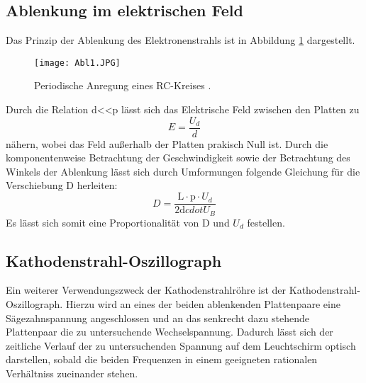 \subsection{Ablenkung im elektrischen Feld}
Das Prinzip der Ablenkung des Elektronenstrahls ist in Abbildung \ref{fig:abl1}
dargestellt.
\begin{figure}[H]
  \centering
  \texttt{[image: Abl1.JPG]}
  \caption{Periodische Anregung eines RC-Kreises \cite{skript}.}
  \label{fig:abl1}
\end{figure}
Durch die Relation d<<p lässt sich das Elektrische Feld zwischen den Platten zu
\begin{equation}
  E = \frac{U_d}{d}
  \label{eqn:efeld}
\end{equation}
nähern, wobei das Feld außerhalb der Platten prakisch Null ist.
Durch die komponentenweise Betrachtung der Geschwindigkeit sowie der Betrachtung
des Winkels der Ablenkung lässt sich durch Umformungen folgende Gleichung für
die Verschiebung D herleiten:
\begin{equation}
   D = \frac{\text{L} \cdot \text{p} \cdot U_d}{2\text{d} cdot U_B}
   \label{eqn:verschiebung}
\end{equation}
Es lässt sich somit eine Proportionalität von D und $U_d$ festellen.

\subsection{Kathodenstrahl-Oszillograph}
Ein weiterer Verwendungszweck der Kathodenstrahlröhre ist der Kathodenstrahl-Oszillograph.
Hierzu wird an eines der beiden ablenkenden Plattenpaare eine Sägezahnspannung angeschlossen
und an das senkrecht dazu stehende Plattenpaar die zu untersuchende Wechselspannung.
Dadurch lässt sich der zeitliche Verlauf der zu untersuchenden Spannung auf
dem Leuchtschirm optisch darstellen, sobald die beiden Frequenzen in einem
geeigneten rationalen Verhältniss zueinander stehen.

